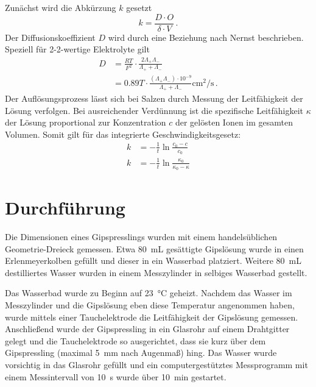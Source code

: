 Zunächst wird die Abkürzung $k$ gesetzt
\begin{equation}
    k = \frac{D \cdot O}{\delta \cdot V}\, \text{.} \label{eqn:schichtdicke}
\end{equation}
Der Diffusionskoeffizient $D$ wird durch eine Beziehung nach Nernst beschrieben. Speziell für 2-2-wertige Elektrolyte gilt
\begin{align}
    D &= \frac{RT}{F^2} \cdot \frac{2 \Lambda_+ \Lambda_-}{\Lambda_+ + \Lambda_-} \nonumber \\
      &= 0.89 T \cdot \frac{(\Lambda_+ \Lambda_-) \cdot 10^{-9}}{\Lambda_+ + \Lambda_-} \unit{\cm\squared\per\second}\, \text{.} \label{eqn:diffusionskoeffizient}
\end{align}
Der Auflösungsprozess lässt sich bei Salzen durch Messung der Leitfähigkeit der Lösung verfolgen.
Bei ausreichender Verdünnung ist die spezifische Leitfähigkeit $\kappa$ der Lösung proportional zur Konzentration $c$ der gelösten Ionen im gesamten Volumen.
Somit gilt für das integrierte Geschwindigkeitsgesetz:
\begin{align}
    k &= - \frac{1}{t} \ln \frac{c_0 - c}{c_0} \\
    k &= - \frac{1}{t} \ln \frac{\kappa_0}{\kappa_0 - \kappa} \label{eqn:geschwindigkeitsgesetz}
\end{align}

\section{Durchführung}
Die Dimensionen eines Gipspresslings wurden mit einem handelsüblichen Geometrie-Dreieck gemessen.
Etwa \qty{80}{\milli\liter} gesättigte Gipslösung wurde in einen Erlenmeyerkolben gefüllt und dieser in ein Wasserbad platziert.
Weitere \qty{80}{\milli\liter} destilliertes Wasser wurden in einem Messzylinder in selbiges Wasserbad gestellt.

Das Wasserbad wurde zu Beginn auf \qty{23}{\degreeCelsius} geheizt.
Nachdem das Wasser im Messzylinder und die Gipslösung eben diese Temperatur angenommen haben, wurde mittels einer Tauchelektrode die Leitfähigkeit der Gipslösung gemessen.
Anschließend wurde der Gipspressling in ein Glasrohr auf einem Drahtgitter gelegt und die Tauchelektrode so ausgerichtet, dass sie kurz über dem Gipspressling (maximal \qty{5}{\milli\meter} nach Augenmaß) hing.
Das Wasser wurde vorsichtig in das Glasrohr gefüllt und ein computergestütztes Messprogramm mit einem Messintervall von \qty{10}{\second} wurde über \qty{10}{\minute} gestartet.

